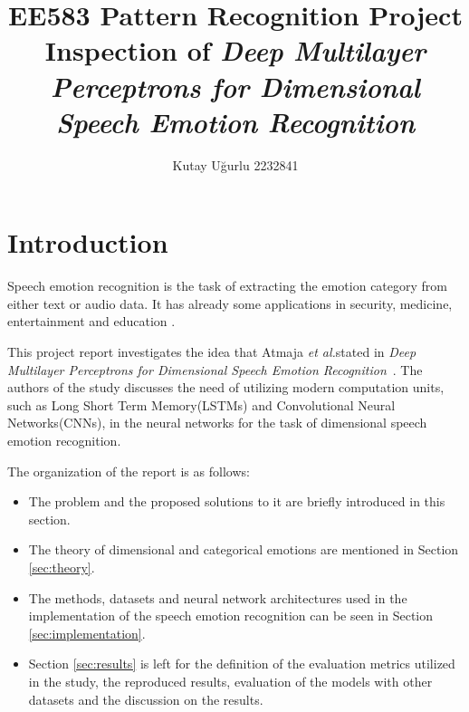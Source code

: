 \documentclass[a4paper,11pt]{article}
\author{Kutay U\u{g}urlu 2232841}
\begin{document}
    

\fancyfoot[C]{\thepage}

\title{\LARGE \LARGE EE583 Pattern Recognition Project \\ 
Inspection of \textit{Deep Multilayer Perceptrons for Dimensional Speech Emotion Recognition}}

\maketitle{\LARGE}
\pagebreak
\tableofcontents
\pagebreak

\section{Introduction}

Speech emotion recognition is the task of extracting the emotion category from either text or audio data. It has already some applications in security, medicine, entertainment and education \cite{cen2016real}. 

This project report investigates the idea that Atmaja \textit{et al.}stated in \textit{Deep Multilayer Perceptrons for Dimensional Speech Emotion Recognition}~\cite{atmaja2020deep}. The authors of the study discusses the need of utilizing modern computation units, such as Long Short Term Memory(LSTMs) and Convolutional Neural Networks(CNNs), in the neural networks for the task of dimensional speech emotion recognition. 

The organization of the report is as follows:
\begin{itemize}
    \item The problem and the proposed solutions to it are briefly introduced in this section.
    \item The theory of dimensional and categorical emotions are mentioned in Section \ref{sec:theory}.
    \item The methods, datasets and neural network architectures used in the implementation of the speech emotion recognition can be seen in Section \ref{sec:implementation}.
    \item Section \ref{sec:results} is left for the definition of the evaluation metrics utilized in the study, the reproduced results, evaluation of the models with other datasets and the discussion on the results.  
\end{itemize}
\end{document}
